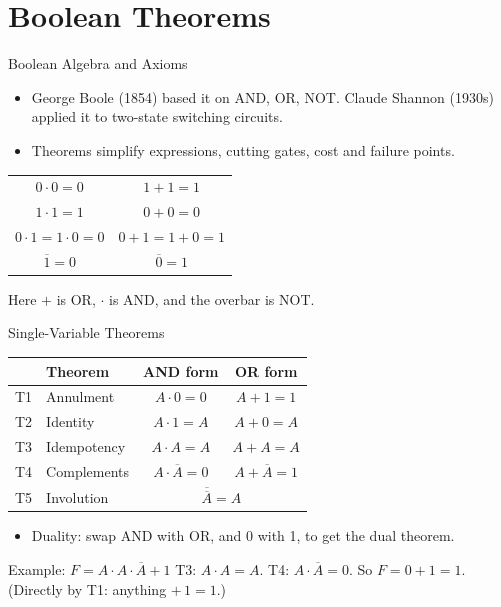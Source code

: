 \documentclass[9pt,aspectratio=169,xcolor=table]{beamer}
\newcommand{\striped}{\rowcolors{1}{white}{stripe}}
\begin{document}
\section{Boolean Theorems}

\begin{frame}{Boolean Algebra and Axioms}
  \begin{itemize}\small\itemsep3pt
    \item George Boole (1854) based it on AND, OR, NOT. Claude Shannon (1930s) applied it to two-state switching circuits.
    \item Theorems simplify expressions, cutting gates, cost and failure points.
  \end{itemize}
  \begin{center}
  \begin{tabular}{cc}
    $0 \cdot 0 = 0$ & $1 + 1 = 1$ \\
    $1 \cdot 1 = 1$ & $0 + 0 = 0$ \\
    $0 \cdot 1 = 1 \cdot 0 = 0$ & $0 + 1 = 1 + 0 = 1$ \\
    $\overline{1} = 0$ & $\overline{0} = 1$ \\
  \end{tabular}
  \end{center}
  {\small Here $+$ is OR, $\cdot$ is AND, and the overbar is NOT.}
\end{frame}

\begin{frame}{Single-Variable Theorems}
  \centering\small\striped
  \begin{tabular}{@{}clcc@{}}
    \toprule
    & \textbf{Theorem} & \textbf{AND form} & \textbf{OR form} \\
    \midrule
    T1 & Annulment & $A \cdot 0 = 0$ & $A + 1 = 1$ \\
    T2 & Identity & $A \cdot 1 = A$ & $A + 0 = A$ \\
    T3 & Idempotency & $A \cdot A = A$ & $A + A = A$ \\
    T4 & Complements & $A \cdot \overline{A} = 0$ & $A + \overline{A} = 1$ \\
    T5 & Involution & \multicolumn{2}{c}{$\overline{\overline{A}} = A$} \\
    \bottomrule
  \end{tabular}
  \begin{itemize}\small\itemsep2pt
    \item \alert{Duality}: swap AND with OR, and 0 with 1, to get the dual theorem.
  \end{itemize}
  \begin{block}{Example: $F = A\cdot A\cdot\overline{A} + 1$}
    \small T3: $A \cdot A = A$. T4: $A\cdot\overline{A} = 0$. So $F = 0 + 1 = 1$. (Directly by T1: anything $+\,1 = 1$.)
  \end{block}
\end{frame}
\end{document}
